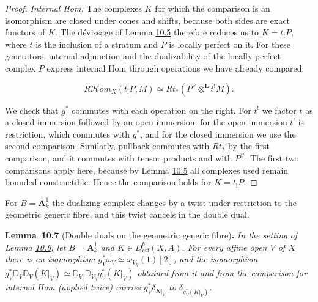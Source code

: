 \documentclass[11pt]{article}
\newenvironment{bpstatement}[2]{\par\addvspace{0.6\baselineskip}\noindent\textbf{#1}#2\textbf{.}\enspace\ignorespaces}
  {\par\addvspace{0.4\baselineskip}}
\newenvironment{bpstatementit}[2]{\begin{bpstatement}{#1}{#2}\itshape\ignorespaces}{\end{bpstatement}}
\providecommand{\cHom}{}\renewcommand{\cHom}{R\mathcal{H}\!om}
\begin{document}
\begin{proof}[{Proof}]
\emph{Internal Hom.} The complexes \(K\) for which the comparison is an isomorphism are closed under cones and shifts, because both sides are exact functors of \(K\). The dévissage of Lemma \hyperref[bp116]{10.5} therefore reduces us to \(K=t_!P\), where \(t\) is the inclusion of a stratum and \(P\) is locally perfect on it. For these generators, internal adjunction and the dualizability of the locally perfect complex \(P\) express internal Hom through operations we have already compared:

\[
\cHom_X(t_!P,M)
\simeq Rt_*(P^\vee\otimes^{\mathbf L}t^!M).
\]

We check that \(g^*\) commutes with each operation on the right. For \(t^!\) we factor \(t\) as a closed immersion followed by an open immersion: for the open immersion \(t^!\) is restriction, which commutes with \(g^*\), and for the closed immersion we use the second comparison. Similarly, pullback commutes with \(Rt_*\) by the first comparison, and it commutes with tensor products and with \(P^\vee\). The first two comparisons apply here, because by Lemma \hyperref[bp116]{10.5} all complexes used remain bounded constructible. Hence the comparison holds for \(K=t_!P\).
\end{proof}

\label{bp121}%
For \(B=\mathbf A^1_k\) the dualizing complex changes by a twist under restriction to the geometric generic fibre, and this twist cancels in the double dual.

\label{bp122}%
\begin{bpstatementit}{Lemma~10.7}{ (Double duals on the geometric generic fibre)}
In the setting of Lemma \hyperref[bp119]{10.6}, let \(B=\mathbf A^1_k\) and \(K\in D^b_{\mathrm{ctf}}(X,A)\). For every affine open \(V\) of \(X\) there is an isomorphism \(g_V^*\omega_V\simeq\omega_{V_{\bar\eta}}(1)[2]\), and the isomorphism \(g_V^*\mathbb D_V\mathbb D_V(K|_V)\simeq\mathbb D_{V_{\bar\eta}}
\mathbb D_{V_{\bar\eta}}g_V^*(K|_V)\) obtained from it and from the comparison for internal Hom (applied twice) carries \(g_V^*\delta_{K|_V}\) to \(\delta_{g_V^*(K|_V)}\).
\end{bpstatementit}
\end{document}
